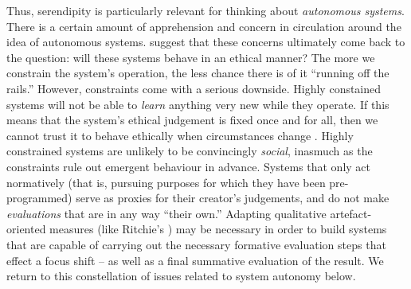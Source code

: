 

Thus, serendipity is particularly relevant for thinking about
\emph{autonomous systems}.  There is a certain amount of apprehension
and concern in circulation around the idea of autonomous systems.
 suggest that these concerns ultimately
come back to the question: will these systems behave in an ethical
manner?  The more we constrain the system's operation, the less chance
there is of it ``running off the rails.''  However, constraints come
with a serious downside.  Highly constained systems will not be able
to \emph{learn} anything very new while they operate.  If this means
that the system's ethical judgement is fixed once and for all, then we
cannot trust it to behave ethically when circumstances change
\cite{powers2005deontological}.  Highly constrained systems are
unlikely to be convincingly \emph{social}, inasmuch as the constraints
rule out emergent behaviour in advance.  Systems that only act
normatively (that is, pursuing purposes for which they have been
pre-programmed) serve as proxies for their creator's judgements, and
do not make \emph{evaluations} that are in any way ``their own.''
Adapting qualitative artefact-oriented measures (like Ritchie's
\citeyearpar{ritchie07}) may be necessary in order to build systems
that are capable of carrying out the necessary formative evaluation
steps that effect a focus shift -- as well as a final summative
evaluation of the result.  We return to this constellation of issues
related to system autonomy below.

%

